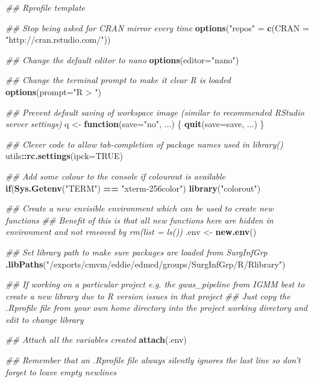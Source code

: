 \documentclass[
]{book}
\newenvironment{Shaded}{\begin{snugshade}}{\end{snugshade}}
\newcommand{\CommentTok}[1]{\textcolor[rgb]{0.56,0.35,0.01}{\textit{#1}}}
\newcommand{\ControlFlowTok}[1]{\textcolor[rgb]{0.13,0.29,0.53}{\textbf{#1}}}
\newcommand{\DataTypeTok}[1]{\textcolor[rgb]{0.13,0.29,0.53}{#1}}
\newcommand{\KeywordTok}[1]{\textcolor[rgb]{0.13,0.29,0.53}{\textbf{#1}}}
\newcommand{\NormalTok}[1]{#1}
\newcommand{\OperatorTok}[1]{\textcolor[rgb]{0.81,0.36,0.00}{\textbf{#1}}}
\newcommand{\OtherTok}[1]{\textcolor[rgb]{0.56,0.35,0.01}{#1}}
\newcommand{\StringTok}[1]{\textcolor[rgb]{0.31,0.60,0.02}{#1}}
\begin{document}
\begin{Shaded}
\begin{Highlighting}[]
\CommentTok{## Rprofile template}


\CommentTok{## Stop being asked for CRAN mirror every time}
\KeywordTok{options}\NormalTok{(}\StringTok{"repos"}\NormalTok{ =}\StringTok{ }\KeywordTok{c}\NormalTok{(}\DataTypeTok{CRAN =} \StringTok{"http://cran.rstudio.com/"}\NormalTok{))}


\CommentTok{## Change the default editor to nano}
\KeywordTok{options}\NormalTok{(}\DataTypeTok{editor=}\StringTok{"nano"}\NormalTok{)}

\CommentTok{## Change the terminal prompt to make it clear R is loaded}
\KeywordTok{options}\NormalTok{(}\DataTypeTok{prompt=}\StringTok{"R > "}\NormalTok{)}

\CommentTok{## Prevent default saving of workspace image (similar to recommended RStudio server settings)}
\NormalTok{q <-}\StringTok{ }\ControlFlowTok{function}\NormalTok{(}\DataTypeTok{save=}\StringTok{"no"}\NormalTok{, ...) \{}
        \KeywordTok{quit}\NormalTok{(}\DataTypeTok{save=}\NormalTok{save, ...)}
\NormalTok{\}}


\CommentTok{## Clever code to allow tab-completion of package names used in library()}
\NormalTok{utils}\OperatorTok{::}\KeywordTok{rc.settings}\NormalTok{(}\DataTypeTok{ipck=}\OtherTok{TRUE}\NormalTok{)}


\CommentTok{## Add some colour to the console if colourout is available}
\ControlFlowTok{if}\NormalTok{(}\KeywordTok{Sys.Getenv}\NormalTok{(}\StringTok{"TERM"}\NormalTok{) }\OperatorTok{==}\StringTok{ "xterm-256color"}\NormalTok{)}
        \KeywordTok{library}\NormalTok{(}\StringTok{"colorout"}\NormalTok{)}

\CommentTok{## Create a new envisible environment which can be used to create new functions}
\CommentTok{## Benefit of this is that all new functions here are hidden in environment and not rmeoved by rm(list = ls())}
\NormalTok{.env <-}\StringTok{ }\KeywordTok{new.env}\NormalTok{()}


\CommentTok{## Set library path to make sure packages are loaded from SurgInfGrp}
\KeywordTok{.libPaths}\NormalTok{(}\StringTok{"/exports/cmvm/eddie/edmed/groups/SurgInfGrp/R/Rlibrary"}\NormalTok{)}


\CommentTok{## If working on a particular project e.g. the gwas_pipeline from IGMM best to create a new library due to R version issues in that project}
\CommentTok{## Just copy the .Rprofile file from your own home directory into the project working directory and edit to change library}


\CommentTok{## Attach all the variables created}
\KeywordTok{attach}\NormalTok{(.env)}


\CommentTok{## Remember that an .Rprofile file always silently ignores the last line so don't forget to leave empty newlines}
\end{Highlighting}
\end{Shaded}
\end{document}
